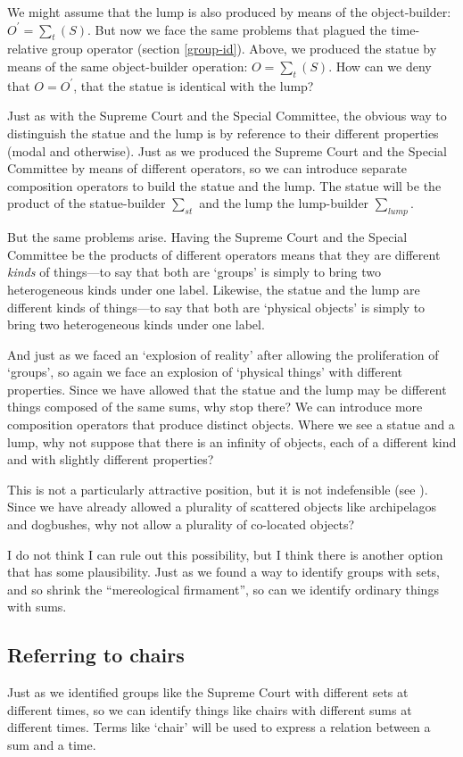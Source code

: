 \documentclass[11pt]{article}
\begin{document}
\begin{spacing}{1.5}
We might assume that the lump is also produced by means of the
object-builder: $O^{\prime} = \sum _{t} ( S )$.  But now we face the
same problems that plagued the time-relative group operator (section
\ref{group-id}).  Above, we produced the statue by means of the same
object-builder operation: $O = \sum _{t} ( S )$.  How can we deny that
$O = O^{\prime}$, that the statue is identical with the lump?

Just as with the Supreme Court and the Special Committee, the obvious
way to distinguish the statue and the lump is by reference to their
different properties (modal and otherwise).  Just as we produced the
Supreme Court and the Special Committee by means of different
operators, so we can introduce separate composition operators to build
the statue and the lump.  The statue will be the product of the
statue-builder $\sum _{st}$ and the lump the lump-builder $\sum
_{lump}$.

But the same problems arise.  Having the Supreme Court and the Special
Committee be the products of different operators means that they are
different {\em kinds} of things---to say that both are `groups' is
simply to bring two heterogeneous kinds under one label.  Likewise, the
statue and the lump are different kinds of things---to say that both
are `physical objects' is simply to bring two heterogeneous kinds
under one label.

And just as we faced an `explosion of reality' after allowing the
proliferation of `groups', so again we face an explosion of `physical
things' with different properties.  Since we have allowed that the
statue and the lump may be different things composed of the same sums,
why stop there?  We can introduce more composition operators that
produce distinct objects.  Where we see a statue and a lump, why not
suppose that there is an infinity of objects, each of a different kind
and with slightly different properties?

This is not a particularly attractive position, but it is not
indefensible (see \citet[section 4]{bennett2004}).  Since we have
already allowed a plurality of scattered objects like archipelagos and
dogbushes, why not allow a plurality of co-located objects?

I do not think I can rule out this possibility, but I think there is
another option that has some plausibility.  Just as we found a way to
identify groups with sets, and so shrink the ``mereological
firmament'', so can we identify ordinary things with sums.

\subsection{Referring to chairs}
\label{chair-ref}
Just as we identified groups like the Supreme Court with different
sets at different times, so we can identify things like chairs with
different sums at different times.  Terms like `chair' will be used to
express a relation between a sum and a time.


\end{spacing}
\end{document}
